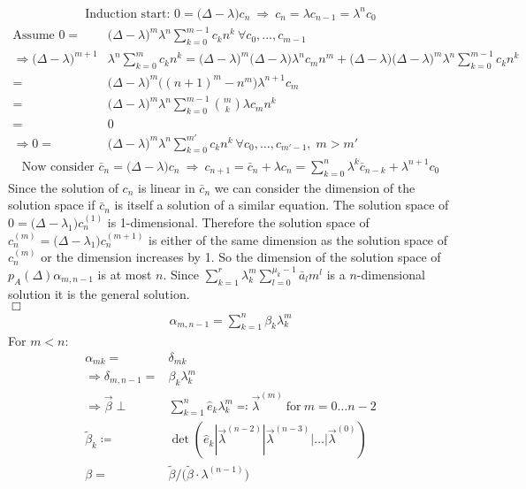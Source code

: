 \documentclass[12pt]{article}
\begin{document}
\begin{align*}
\text{Induction start: } 0 = \big( \Delta - \lambda \big) c_n\ \Rightarrow\ c_n = \lambda c_{n-1} = \lambda^n c_0
\end{align*}
\begin{align*}
\text{Assume } 0 =& \big( \Delta - \lambda \big)^m \lambda^n \sum_{k=0}^{m-1} c_k n^k \ \forall c_0, \dots, c_{m-1}\\
\Rightarrow \big( \Delta - \lambda \big)^{m+1} &\lambda^n \sum_{k=0}^m c_k n^k = \big( \Delta - \lambda \big)^m \big( \Delta - \lambda \big) \lambda^n c_m n^m + \big( \Delta - \lambda \big) \big( \Delta - \lambda \big)^m \lambda^n \sum_{k=0}^{m-1} c_k n^k\\
=& \big( \Delta - \lambda \big)^m \big( (n+1)^m - n^m \big) \lambda^{n+1} c_m \\
=& \big( \Delta - \lambda \big)^m \lambda^n \sum_{k=0}^{m-1} \binom mk \lambda c_m n^k\\
=& 0\\
\Rightarrow 0 =& \big( \Delta - \lambda \big)^m \lambda^n \sum_{k=0}^{m'} c_k n^k \ \forall c_0, \dots, c_{m'-1},\; m>m'
\end{align*}
\begin{align*}
\text{Now consider } \bar c_n = \big(\Delta - \lambda\big) c_n\ \Rightarrow\ c_{n+1} = \bar c_n + \lambda c_n = \sum_{k=0}^n \lambda^k \bar c_{n-k} + \lambda^{n+1} c_0
\end{align*}
Since the solution of $c_n$ is linear in $\bar c_n$ we can consider the dimension of the solution space if $\bar c_n$ is itself a solution of a similar equation. The solution space of $0 = \big(\Delta - \lambda_1\big) c_n^{(1)}$ is 1-dimensional. Therefore the solution space of $c_n^{(m)} = \big(\Delta - \lambda_1\big) c_n^{(m+1)}$ is either of the same dimension as the solution space of $c_n^{(m)}$ or the dimension increases by 1. So the dimension of the solution space of $p_A(\Delta) \alpha_{m, n-1}$ is at most $n$. Since $\sum_{k=1}^r \lambda_k^m \sum_{l=0}^{\mu_k-1} \bar a_l m^l$ is a $n$-dimensional solution it is the general solution.\\ \null\hfill$\Box$
\begin{align}
\alpha_{m,n-1} = \sum_{k=1}^n \beta_k \lambda_k^m
\end{align}
For $m<n$:
\begin{align}
\alpha_{mk} =& \delta_{mk}\\
\Rightarrow \delta_{m,n-1} =& \beta_k \lambda_k^m\\
\Rightarrow \vec \beta \perp& \sum_{k=1}^n \hat e_k \lambda_k^m \eqqcolon \vec \lambda^{(m)} \ \text{for}\ m=0\dots n-2\\
\tilde\beta_k \coloneqq& \det(\hat e_k | \vec\lambda^{(n-2)} | \vec\lambda^{(n-3)} | \dots | \vec\lambda^{(0)})\nonumber\\
\beta =& \tilde\beta /\big( \tilde \beta \cdot \lambda^{(n-1)} \big)
\end{align}
\end{document}
